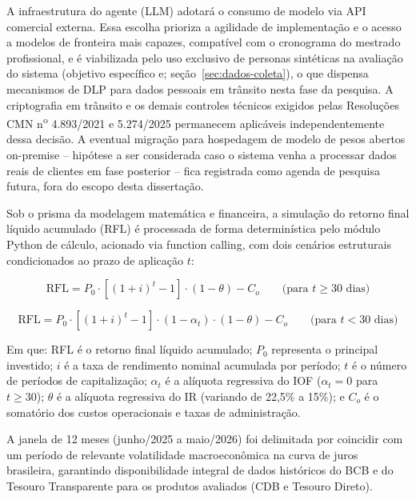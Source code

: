 A infraestrutura do agente (LLM) adotar\'a o consumo de modelo via API
comercial externa. Essa escolha prioriza a agilidade de implementa\c{c}\~ao
e o acesso a modelos de fronteira mais capazes, compat\'ivel com o
cronograma do mestrado profissional, e \'e viabilizada pelo uso exclusivo
de personas sint\'eticas na avalia\c{c}\~ao do sistema (objetivo
espec\'ifico e; se\c{c}\~ao~\ref{sec:dados-coleta}), o que dispensa
mecanismos de DLP para dados pessoais em tr\^ansito nesta fase da
pesquisa. A criptografia em tr\^ansito e os demais controles t\'ecnicos
exigidos pelas Resolu\c{c}\~oes CMN n\textsuperscript{o} 4.893/2021 e
5.274/2025 permanecem aplic\'aveis independentemente dessa decis\~ao. A
eventual migra\c{c}\~ao para hospedagem de modelo de pesos abertos
on-premise -- hip\'otese a ser considerada caso o sistema venha a
processar dados reais de clientes em fase posterior -- fica registrada
como agenda de pesquisa futura, fora do escopo desta disserta\c{c}\~ao.

Sob o prisma da modelagem matem\'atica e financeira, a simula\c{c}\~ao do
retorno final l\'iquido acumulado (RFL) \'e processada de forma
determin\'istica pelo m\'odulo Python de c\'alculo, acionado via function
calling, com dois cen\'arios estruturais condicionados ao prazo de
aplica\c{c}\~ao $t$:

\begin{equation}
  \text{RFL} = P_0 \cdot \left[(1+i)^t - 1\right] \cdot (1-\theta) - C_o
  \qquad \text{(para } t \geq 30 \text{ dias)}
  \label{eq:rfl1}
\end{equation}

\begin{equation}
  \text{RFL} = P_0 \cdot \left[(1+i)^t - 1\right] \cdot (1-\alpha_t) \cdot (1-\theta) - C_o
  \qquad \text{(para } t < 30 \text{ dias)}
  \label{eq:rfl2}
\end{equation}

Em que: RFL \'e o retorno final l\'iquido acumulado; $P_0$ representa o
principal investido; $i$ \'e a taxa de rendimento nominal acumulada por
per\'iodo; $t$ \'e o n\'umero de per\'iodos de capitaliza\c{c}\~ao;
$\alpha_t$ \'e a al\'iquota regressiva do IOF ($\alpha_t = 0$ para
$t \geq 30$); $\theta$ \'e a al\'iquota regressiva do IR (variando de
22,5\% a 15\%); e $C_o$ \'e o somat\'orio dos custos operacionais e taxas
de administra\c{c}\~ao.

A janela de 12 meses (junho/2025 a maio/2026) foi delimitada por
coincidir com um per\'iodo de relevante volatilidade macroecon\^omica na
curva de juros brasileira, garantindo disponibilidade integral de dados
hist\'oricos do BCB e do Tesouro Transparente para os produtos avaliados (CDB
e Tesouro Direto).

